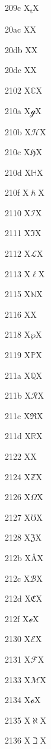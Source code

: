 \documentclass[11pt]{article}
\begin{document}
209c X{\textsubscript{t}}X

20ac X{\texteuro}X

20db X{\ensuremath{\dddot{}}}X

20dc X{\ensuremath{\ddddot{}}}X

2102 X{\ensuremath{\mathbb{C}}}X

210a X{\ensuremath{\mathscr{g}}}X

210b X{\ensuremath{\mathscr{H}}}X

210c X{\ensuremath{\mathfrak{H}}}X

210d X{\ensuremath{\mathbb{H}}}X

210f X{\ensuremath{\hslash}}X

2110 X{\ensuremath{\mathscr{I}}}X

2111 X{\ensuremath{\Im}}X

2112 X{\ensuremath{\mathscr{L}}}X

2113 X{\ensuremath{\ell}}X

2115 X{\ensuremath{\mathbb{N}}}X

2116 X{\textnumero}X

2118 X{\ensuremath{\wp}}X

2119 X{\ensuremath{\mathbb{P}}}X

211a X{\ensuremath{\mathbb{Q}}}X

211b X{\ensuremath{\mathscr{R}}}X

211c X{\ensuremath{\Re}}X

211d X{\ensuremath{\mathbb{R}}}X

2122 X{\texttrademark}X

2124 X{\ensuremath{\mathbb{Z}}}X

2126 X{\ensuremath{\Omega}}X

2127 X{\ensuremath{\mho}}X

2128 X{\ensuremath{\mathfrak{Z}}}X

212b X{\AA}X

212c X{\ensuremath{\mathscr{B}}}X

212d X{\ensuremath{\mathfrak{C}}}X

212f X{\ensuremath{\mathscr{e}}}X

2130 X{\ensuremath{\mathscr{E}}}X

2131 X{\ensuremath{\mathscr{F}}}X

2133 X{\ensuremath{\mathscr{M}}}X

2134 X{\ensuremath{\mathscr{o}}}X

2135 X{\ensuremath{\aleph}}X

2136 X{\ensuremath{\beth}}X
\end{document}
